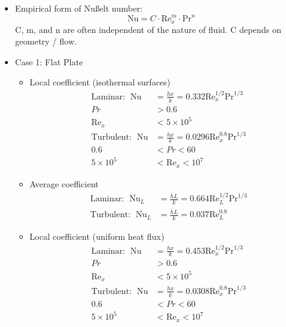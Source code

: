 \begin{itemize}
    \item Empirical form of Nußelt number: 
    \begin{equation*}
        \text{Nu}=C\cdot \text{Re}^{m}_{x}\cdot \text{Pr}^{n}
    \end{equation*}
    C, m, and n are often independent of the nature of fluid. C depends on geometry / flow.  
    \item Case 1: \color{red} Flat Plate \color{black}
    \begin{itemize}
        \item Local coefficient \color{blue} (isothermal surfaces) \color{black}
        \begin{align*}
            \text{Laminar: }\; \text{Nu} &= \frac{hx}{k} = 0.332 \text{Re}_{x}^{1/2} \text{Pr}^{1/3} \\
            Pr &> 0.6 \\
            \text{Re}_{x} &< 5\times 10^5\\
            \text{Turbulent: }\; \text{Nu} &= \frac{hx}{k} = 0.0296 \text{Re}_{x}^{0.8} \text{Pr}^{1/3} \\
            0.6 &< Pr < 60 \\
            5\times 10^5 &< \text{Re}_{x} < 10^7
        \end{align*}
        \item Average coefficient
        \begin{align*}
            \text{Laminar: }\; \overline{\text{Nu}}_L &= \frac{\bar{h}L}{k} = 0.664 \text{Re}_{L}^{1/2} \text{Pr}^{1/3} \\
            \text{Turbulent: }\; \overline{\text{Nu}}_L &= \frac{\bar{h}L}{k} = 0.037 \text{Re}_{L}^{0.8}
        \end{align*}
        \item Local coefficient \color{blue} (uniform heat flux) \color{black}
        \begin{align*}
            \text{Laminar: }\; \text{Nu} &= \frac{hx}{k} = 0.453 \text{Re}_{x}^{1/2} \text{Pr}^{1/3} \\
            Pr &> 0.6 \\
            \text{Re}_{x} &< 5\times 10^5\\
            \text{Turbulent: }\; \text{Nu} &= \frac{hx}{k} = 0.0308 \text{Re}_{x}^{0.8} \text{Pr}^{1/3} \\
            0.6 &< Pr < 60 \\
            5\times 10^5 &< \text{Re}_{x} < 10^7
        \end{align*}

\end{itemize}
\end{itemize}

